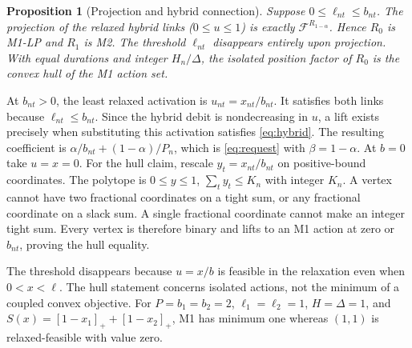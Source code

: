 \documentclass[10pt,journal]{IEEEtran}
\newtheorem{proposition}{Proposition}
\newcommand{\pos}[1]{\left[#1\right]_+}
\newcommand{\F}{\mathcal F}
\begin{document}
\begin{proposition}[Projection and hybrid connection]
\label{prop:projection}
Suppose $0\leq\ell_{nt}\leq b_{nt}$. The projection of the relaxed hybrid links ($0\leq u\leq1$) is exactly $\F^{R_{1-\alpha}}$. Hence $R_0$ is M1-LP and $R_1$ is M2. The threshold $\ell_{nt}$ disappears entirely upon projection. With equal durations and integer $H_n/\Delta$, the isolated position factor of $R_0$ is the convex hull of the M1 action set.
\end{proposition}
\begin{IEEEproof}
At $b_{nt}>0$, the least relaxed activation is $u_{nt}=x_{nt}/b_{nt}$. It satisfies both links because $\ell_{nt}\leq b_{nt}$. Since the hybrid debit is nondecreasing in $u$, a lift exists precisely when substituting this activation satisfies \eqref{eq:hybrid}. The resulting coefficient is $\alpha/b_{nt}+(1-\alpha)/P_n$, which is \eqref{eq:request} with $\beta=1-\alpha$. At $b=0$ take $u=x=0$. For the hull claim, rescale $y_t=x_{nt}/b_{nt}$ on positive-bound coordinates. The polytope is $0\leq y\leq1$, $\sum_ty_t\leq K_n$ with integer $K_n$. A vertex cannot have two fractional coordinates on a tight sum, or any fractional coordinate on a slack sum. A single fractional coordinate cannot make an integer tight sum. Every vertex is therefore binary and lifts to an M1 action at zero or $b_{nt}$, proving the hull equality.
\end{IEEEproof}
The threshold disappears because $u=x/b$ is feasible in the relaxation even when $0<x<\ell$. The hull statement concerns isolated actions, not the minimum of a coupled convex objective. For $P=b_1=b_2=2$, $\ell_1=\ell_2=1$, $H=\Delta=1$, and $S(x)=\pos{1-x_1}+\pos{1-x_2}$, M1 has minimum one whereas $(1,1)$ is relaxed-feasible with value zero.
\end{document}
